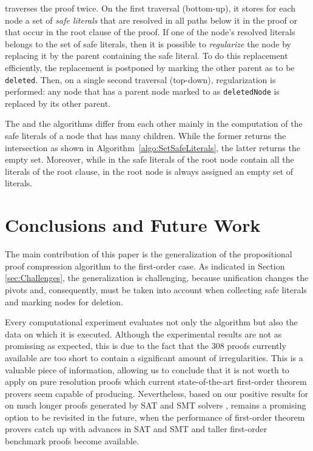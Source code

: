 \documentclass{llncs}
\begin{document}
{\RPI} traverses the proof twice. On the first traversal (bottom-up), it stores for each node a set of \emph{safe literals} that are resolved in all paths below it in the proof or that occur in the root clause of the proof. If one of the node's resolved literals belongs to the set of safe literals, then it is possible to \emph{regularize} the node by replacing it by the parent containing the safe literal. To do this replacement efficiently, the replacement is postponed by marking the other parent as to be \texttt{deleted}. Then, on a single second traversal (top-down), regularization is performed: any node that has a parent node marked to as \texttt{deletedNode} is replaced by its other parent.

The {\RPI} and the {\RP} algorithms differ from each other mainly in the
computation of the safe literals of a node that has many children. While the former 
returns the intersection as shown in Algorithm~\ref{algo:SetSafeLiterals}, the latter
returns the empty set. 
Moreover, while in {\RPI} the safe literals of the root node contain all the literals of the root clause, in {\RP} the root node is always assigned an empty set of literals. 






\section{Conclusions and Future Work}

The main contribution of this paper is the generalization of the propositional proof compression algorithm {\RPI} to the first-order case. As indicated in Section \ref{sec:Challenges}, the generalization is challenging, because unification changes the pivots and, consequently, must be taken into account when collecting safe literals and marking nodes for deletion.

Every computational experiment evaluates not only the algorithm but also the data on which it is executed. Although the experimental results are not as promissing as expected, this is due to the fact that the 308 proofs currently available are too short to contain a significant amount of irregularities. This is a valuable piece of information, allowing us to conclude that it is not worth to apply {\FORPI} on pure resolution proofs which current state-of-the-art first-order theorem provers seem capable of producing. Nevertheless, based on our positive results for {\RPI} on much longer proofs generated by SAT and SMT solvers \cite{LURPI}, {\FORPI} remains a promising option to be revisited in the future, when the performance of first-order theorem provers catch up with advances in SAT and SMT and taller first-order benchmark proofs become available.
\end{document}
